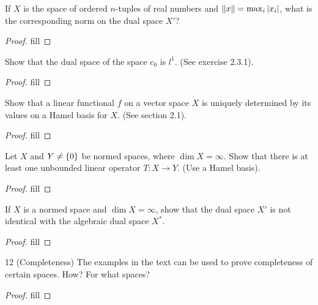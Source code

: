 \begin{exercise}{6}
If $X$ is the space of ordered $n$-tuples of real numbers and $\left\lVert x\right\rVert=\max_i \left\lvert x_i\right\rvert$, what is the corresponding norm on the dual space $X'$?
\end{exercise}
\begin{proof}
fill
\end{proof}

\begin{exercise}{8}
Show that the dual space of the space $c_0$ is $l^1$. 
(See exercise 2.3.1).
\end{exercise}
\begin{proof}
fill
\end{proof}

\begin{exercise}{9}
Show that a linear functional $f$ on a vector space $X$ is uniquely determined by its values on a Hamel basis for $X$.
(See section 2.1).
\end{exercise}
\begin{proof}
fill
\end{proof}

\begin{exercise}{10}
Let $X$ and $Y\neq\{0\}$ be normed spaces, where $\dim X=\infty $.
Show that there is at least one unbounded linear operator $T:X\to Y$.
(Use a Hamel basis).
\end{exercise}
\begin{proof}
fill
\end{proof}

\begin{exercise}{11}
If $X$ is a normed space and $\dim X=\infty$, show that the dual space $X'$ is not identical with the algebraic dual space $X^\ast$.
\end{exercise}
\begin{proof}
fill
\end{proof}

\begin{exercise}{12 (Completeness)}
The examples in the text can be used to prove completeness of certain spaces.
How?
For what spaces?
\end{exercise}
\begin{proof}
fill
\end{proof}
